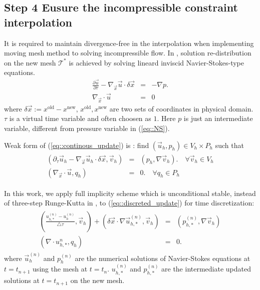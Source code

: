 \documentclass[a4paper, 11pt]{article}
\begin{document}
   \subsection{Step 4 Eusure the incompressible constraint
     interpolation}
      It is required to maintain divergence-free in the interpolation
      when implementing moving mesh method to solving incompressible
      flow. In \cite{di2005moving}, solution re-distribution on the new 
      mesh $\mathcal{T}^*$ is achieved by solving lineard inviscid 
      Navier-Stokes-type equations.
      \begin{eqnarray}
        \frac{\partial \vec{u}}{\partial \tau} - \nabla_{\vec{x}}\vec{u}
        \cdot \delta \vec{x} & = & - \nabla p. \\
        \nabla_{\vec{x}}\cdot \vec{u} & = & 0
        \label{eq::continous_update}
      \end{eqnarray} 
      where $\delta \vec{x} := x^{\text{old}} - x^{\text{new}}$,
      $x^{\text{old}}, x^{\text{new}}$ are two sets of coordinates in
      physical domain. $\tau$ is a virtual time variable and often
      choosen as $1$. Here $p$ is just an intermediate variable,
      different from pressure variable in (\ref{eq::NS}). 

      Weak form of (\ref{eq::continous_update}) is : find $(\vec{u}_h,
      p_h) \in V_h \times P_h$ such that 
      \begin{eqnarray}
        \begin{aligned}
          \left( \partial_{\tau} \vec{u}_h - \nabla_{\vec{x}}\vec{u}_h
            \cdot \delta \vec{x}, \vec{v}_h \right) & = & \left( p_h, \nabla
            \vec{v}_h \right). \quad \forall \vec{v}_h \in V_h \\
          \left( \nabla_{\vec{x}} \cdot \vec{u}, q_h\right) & = & 0. \quad \forall
          q_h \in P_h 
        \end{aligned}
        \label{eq::discreted_update}
      \end{eqnarray}
      
      In this work, we apply full implicity scheme which is
      unconditional stable, instead of
      three-step Runge-Kutta in \cite{di2005moving}, to
      (\ref{eq::discreted_update}) for time discretization:
      \begin{eqnarray}
        \begin{aligned}
          \left ( \frac{u_{h, *}^{(n)} - u_h^{(n)}}{\triangle \tau},
            \vec{v}_h \right) + \left( \delta \vec{x} \cdot \nabla 
            \vec{u}_{h, *}^{(n)}, \vec{v}_h \right)  & = & \left( 
            p_{h, *}^{(n)}, \nabla \vec{v}_h \right) \\
          \left( \nabla \cdot u_{h, *}^{n}, q_h \right) & = & 0.
        \end{aligned}
      \end{eqnarray}
      where $\vec{u}_h^{(n)}$ and $p_h^{(n)}$ are the numerical solutions of
      Navier-Stokes equations at $t = t_{n + 1}$ using the mesh at $t
      = t_n$. $u_{h,*}^{(n)}$ and $p_{h, *}^{(n)}$ are the intermediate
      updated solutions at $t =t_{n + 1}$ on the new mesh. 
   
\end{document}
